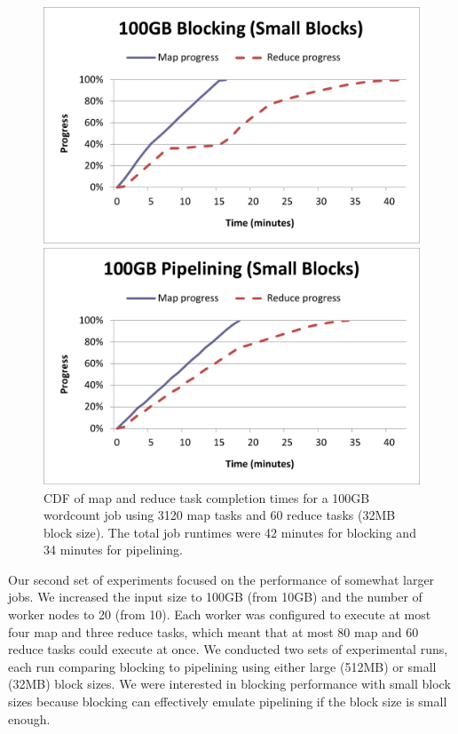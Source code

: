 \begin{figure}[t]
\ssp
\begin{minipage}{0.5\linewidth}
  \centering
        \includegraphics[width=0.95\linewidth]{figures/wc_100gb_3120m60r_blocking}
\end{minipage}
\begin{minipage}{0.5\linewidth}
  \centering
        \includegraphics[width=0.95\linewidth]{figures/wc_100gb_3120m60r_pipeline}
\end{minipage}
\caption{CDF of map and reduce task completion times for a 100GB wordcount job
  using 3120 map tasks and 60 reduce tasks (32MB block size). The total job
  runtimes were 42 minutes for blocking and 34 minutes for pipelining.}
\label{ch:hop:fig:wc5}
\end{figure}

Our second set of experiments focused on the performance of somewhat larger
jobs. We increased the input size to 100GB (from 10GB) and the number of worker
nodes to 20 (from 10). Each worker was configured to execute at most four map
and three reduce tasks, which meant that at most 80 map and 60 reduce tasks
could execute at once. We conducted two sets of experimental runs, each run
comparing blocking to pipelining using either large (512MB) or small (32MB)
block sizes. We were interested in blocking performance with small block sizes
because blocking can effectively emulate pipelining if the block size is small
enough.

